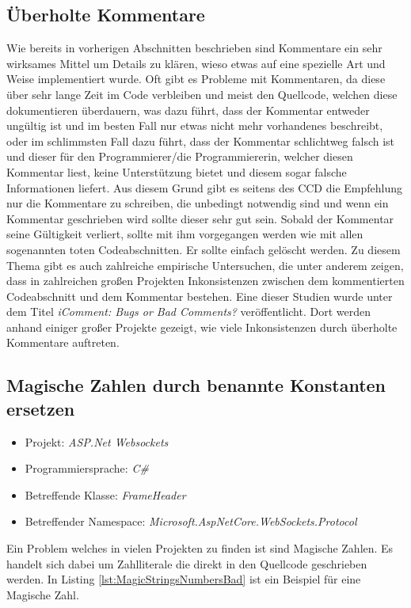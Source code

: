 \subsection{Überholte Kommentare}
\SuperPar Wie bereits in vorherigen Abschnitten beschrieben sind Kommentare ein sehr wirksames Mittel um Details zu klären, wieso etwas auf eine spezielle Art und Weise implementiert wurde. Oft gibt es Probleme mit Kommentaren, da diese über sehr lange Zeit im Code verbleiben und meist den Quellcode, welchen diese dokumentieren überdauern, was dazu führt, dass der Kommentar entweder ungültig ist und im besten Fall nur etwas nicht mehr vorhandenes beschreibt, oder im schlimmsten Fall dazu führt, dass der Kommentar schlichtweg falsch ist und dieser für den Programmierer/die Programmiererin, welcher diesen Kommentar liest, keine Unterstützung bietet und diesem sogar falsche Informationen liefert. Aus diesem Grund gibt es seitens des CCD die Empfehlung nur die Kommentare zu schreiben, die unbedingt notwendig sind und wenn ein Kommentar geschrieben wird sollte dieser sehr gut sein. Sobald der Kommentar seine Gültigkeit verliert, sollte mit ihm vorgegangen werden wie mit allen sogenannten toten Codeabschnitten. Er sollte einfach gelöscht werden. Zu diesem Thema gibt es auch zahlreiche empirische Untersuchen, die unter anderem zeigen, dass in zahlreichen großen Projekten Inkonsistenzen zwischen dem kommentierten Codeabschnitt und dem Kommentar bestehen. Eine dieser Studien wurde unter dem Titel \textit{iComment: Bugs or Bad Comments?} \cite{Lin2007} veröffentlicht. Dort werden anhand einiger großer Projekte gezeigt, wie viele Inkonsistenzen durch überholte Kommentare auftreten.

\subsection{Magische Zahlen durch benannte Konstanten ersetzen}
\begin{itemize}
	\item Projekt: \textit{ASP.Net Websockets}
	\item Programmiersprache: \textit{C\#}
	\item Betreffende Klasse: \textit{FrameHeader}
	\item Betreffender Namespace: \textit{Microsoft.AspNetCore.WebSockets.Protocol}
\end{itemize}

\SuperPar Ein Problem welches in vielen Projekten zu finden ist sind Magische Zahlen. Es handelt sich dabei um Zahlliterale die direkt in den Quellcode geschrieben werden. In Listing \ref{lst:MagicStringsNumbersBad} ist ein Beispiel für eine Magische Zahl.

